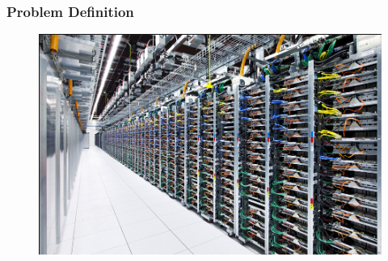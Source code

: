 \documentclass[xcolor=pdftex,dvipsnames,table]{beamer}
\begin{document}
\begin{frame}
	\frametitle{Problem Definition}		
	\begin{figure}[H]
    		\begin{center}
        		\includegraphics[scale=0.28]{DataCenter.png}
    		\end{center}
   		\end{figure}
\end{frame}
\end{document}
